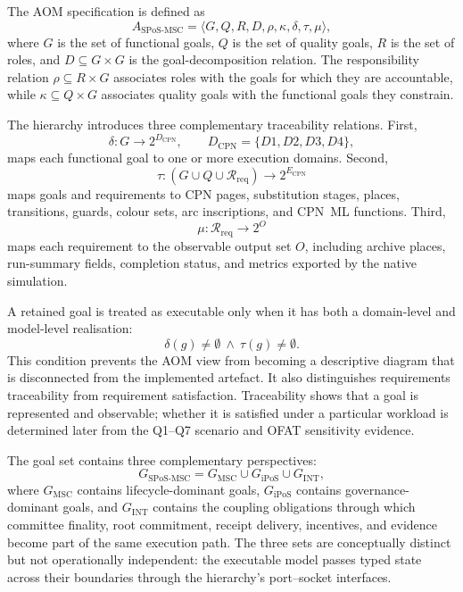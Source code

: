 \documentclass[a4paper,fleqn]{cas-sc}
\begin{document}
The AOM specification is defined as
\begin{equation}
A_{\mathrm{SPoS\text{-}MSC}}
 = \langle G,Q,R,D,\rho,\kappa,\delta,\tau,\mu\rangle,
\end{equation}
where $G$ is the set of functional goals, $Q$ is the set of quality goals, $R$
is the set of roles, and $D\subseteq G\times G$ is the goal-decomposition
relation. The responsibility relation $\rho\subseteq R\times G$ associates
roles with the goals for which they are accountable, while
$\kappa\subseteq Q\times G$ associates quality goals with the functional goals
they constrain.

The hierarchy introduces three complementary traceability relations.
First,
\begin{equation}
\delta:G\rightarrow 2^{D_{\mathrm{CPN}}},
\qquad
D_{\mathrm{CPN}}=\{D1,D2,D3,D4\},
\end{equation}
maps each functional goal to one or more execution domains. Second,
\begin{equation}
\tau:(G\cup Q\cup \mathcal{R}_{\mathrm{req}})
\rightarrow 2^{E_{\mathrm{CPN}}}
\end{equation}
maps goals and requirements to CPN pages, substitution stages, places,
transitions, guards, colour sets, arc inscriptions, and CPN~ML functions.
Third,
\begin{equation}
\mu:\mathcal{R}_{\mathrm{req}}\rightarrow 2^{O}
\end{equation}
maps each requirement to the observable output set $O$, including archive
places, run-summary fields, completion status, and metrics exported by the
native simulation.

A retained goal is treated as executable only when it has both a domain-level
and model-level realisation:
\begin{equation}
\delta(g)\neq\emptyset \ \wedge\ \tau(g)\neq\emptyset.
\end{equation}
This condition prevents the AOM view from becoming a descriptive diagram that
is disconnected from the implemented artefact. It also distinguishes
requirements traceability from requirement satisfaction. Traceability shows
that a goal is represented and observable; whether it is satisfied under a
particular workload is determined later from the Q1--Q7 scenario and OFAT sensitivity evidence.

The goal set contains three complementary perspectives:
\begin{equation}
G_{\mathrm{SPoS\text{-}MSC}
}=G_{\mathrm{MSC}}\cup G_{\mathrm{iPoS}}\cup G_{\mathrm{INT}},
\end{equation}
where $G_{\mathrm{MSC}}$ contains lifecycle-dominant goals,
$G_{\mathrm{iPoS}}$ contains governance-dominant goals, and
$G_{\mathrm{INT}}$ contains the coupling obligations through which committee
finality, root commitment, receipt delivery, incentives, and evidence become
part of the same execution path. The three sets are conceptually distinct but
not operationally independent: the executable model passes typed state across
their boundaries through the hierarchy's port--socket interfaces.
\end{document}
